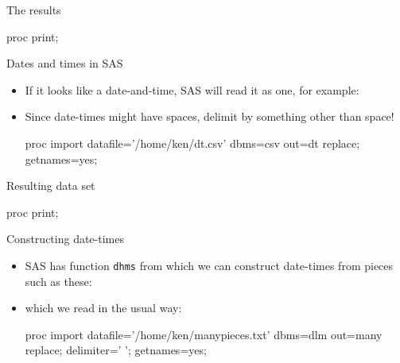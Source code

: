 \documentclass[unknownkeysallowed]{beamer}\usepackage[]{graphicx}\usepackage[]{color}
\begin{document}
\begin{frame}[fragile]{The results}

\begin{Sascode}[store=dn]
proc print;  
\end{Sascode}


  
  
\end{frame}

\begin{frame}[fragile]{Dates and times in SAS}

  \begin{itemize}
\item If it looks like a date-and-time, SAS will read it as one, for example:
  
  
  
\item Since date-times might have spaces, delimit by something other
  than space!

\begin{Datastep}
proc import
  datafile='/home/ken/dt.csv'
    dbms=csv
    out=dt
    replace;
  getnames=yes;
\end{Datastep}
    

  

\end{itemize}
  
\end{frame}

\begin{frame}[fragile]{Resulting data set}

\begin{Sascode}[store=do]
proc print;  
\end{Sascode}
  
  
\end{frame}

\begin{frame}[fragile]{Constructing date-times}
  
  \begin{itemize}
  \item SAS has function \texttt{dhms} from which we can construct
    date-times from pieces such as these:
    
        
    
    
  \item which we read in the usual way:
  
    \begin{Datastep}
proc import
  datafile='/home/ken/manypieces.txt'
    dbms=dlm
    out=many
    replace;
  delimiter=' ';
  getnames=yes;
    \end{Datastep}

      
  
  
  \end{itemize}
  
\end{frame}
\end{document}
